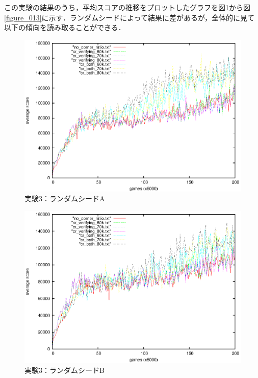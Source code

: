 \documentclass{suribt}
\begin{document}
この実験の結果のうち，平均スコアの推移をプロットしたグラフを図\ref{figure_011}から図\ref{figure_013}に示す．ランダムシードによって結果に差があるが，全体的に見て以下の傾向を読み取ることができる．

\begin{figure}[tb]
	\begin{center}
	\includegraphics[width=13cm]{figure_011.eps}
	\caption{実験3：ランダムシードA}
	\label{figure_011}
	\end{center}
\end{figure}

\begin{figure}[tb]
	\begin{center}
	\includegraphics[width=13cm]{figure_012.eps}
	\caption{実験3：ランダムシードB}
	\label{figure_012}
	\end{center}
\end{figure}
\end{document}
